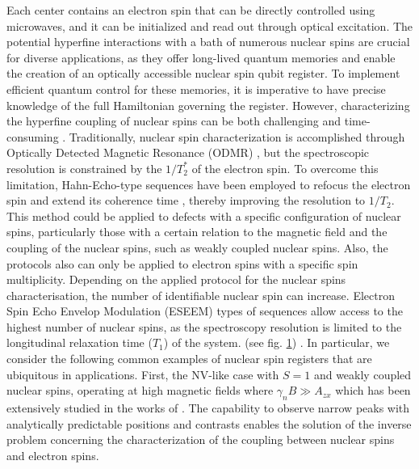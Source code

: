 \documentclass[%
 reprint,
superscriptaddress,
 amsmath,amssymb,
 aps,
]{revtex4-2}
\begin{document}
\begin{figure}
\begin{center}
		\label{fig:1}
	\end{center}
\end{figure}

Each center contains an electron spin that can be directly controlled using microwaves, and it can be initialized and read out through optical excitation. 
The potential hyperfine interactions with a bath of numerous nuclear spins are crucial for diverse applications, as they offer long-lived quantum memories and enable the creation of an optically accessible nuclear spin qubit register.
To implement efficient quantum control for these memories, it is imperative to have precise knowledge of the full Hamiltonian governing the register.
However, characterizing the hyperfine coupling of nuclear spins can be both challenging and time-consuming \cite{abobeih2019atomic, van2023mapping}. 
Traditionally, nuclear spin characterization is accomplished through Optically Detected Magnetic Resonance (ODMR) \cite{Dreau:2012aa,hesselmeier2023measuring}, but the spectroscopic resolution is constrained by the $1/T_2^\ast$ of the electron spin. 
To overcome this limitation, Hahn-Echo-type sequences have been employed to refocus the electron spin and extend its coherence time \cite{childress2006coherent}, thereby improving the resolution to $1/T_2$. 
This method could be applied to defects with a specific configuration of nuclear spins, particularly those with a certain relation to the magnetic field and the coupling of the nuclear spins, such as weakly coupled nuclear spins.
Also, the protocols also can only be applied to electron spins with a specific spin multiplicity.
Depending on the applied protocol for the nuclear spins characterisation, the number of identifiable nuclear spin can increase.
Electron Spin Echo Envelop Modulation (ESEEM) types of sequences allow access to the highest number of nuclear spins, as the spectroscopy resolution is limited to the longitudinal relaxation time ($T_1$) of the system. (see fig. \ref{fig:1}) \cite{laraoui2013high, vorobyov2022addressing}.
In particular, we consider the following common examples of nuclear spin registers that are ubiquitous in applications. First, the NV-like case with $S=1$ and weakly coupled nuclear spins, operating at high magnetic fields where $\gamma_n B \gg A_{zx}$ which has been extensively studied in the works of \cite{abobeih2019atomic, taminiau2012detection, Zhao:2014aa}.
The capability to observe narrow peaks with analytically predictable positions and contrasts enables the solution of the inverse problem concerning the characterization of the coupling between nuclear spins and electron spins. 
\end{document}
